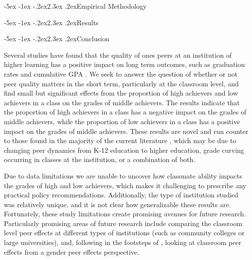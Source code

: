 \documentclass[12pt,a4paper,english,fleqn]{article}
\makeatletter
\renewcommand\section{\@startsection{section}{1}{\z@}
{-5ex \@plus -1ex \@minus -.2ex}{2.3ex \@plus.2ex}{\normalfont\large\bf}}
\makeatother
\begin{document}


\section{Empirical Methodology}\label{methods}



\section{Results}\label{results}



\section{Conclusion}\label{conclusion}


Several studies have found that the quality of ones peers at an institution of higher learning has a positive impact on long term outcomes, such as graduation rates and cumulative GPA \citep{smith2015new,luppino2015college,ost2010role}.
We seek to answer the question of whether or not peer quality matters in the short term, particularly at the classroom level, and find small but significant effects from the proportion of high achievers and low achievers in a class on the grades of middle achievers. 
The results indicate that the proportion of high achievers in a class has a negative impact on the grades of middle achievers, while the proportion of low achievers in a class has a positive impact on the grades of middle achievers. 
These results are novel and run counter to those found in the majority of the current literature \citep{kang2007classroom,carman2012classroom,burke2013classroom,schlosser2008inside,lavy2012good}, which may be due to changing peer dynamics from K-12 education to higher education, grade curving occurring in classes at the institution, or a combination of both.
 
Due to data limitations we are unable to uncover how classmate ability impacts the grades of high and low achievers, which makes it challenging to prescribe any practical policy recommendations.
Additionally, the type of institution studied was relatively unique, and it is not clear how generalizable these results are. 
Fortunately, these study limitations create promising avenues for future research.
Particularly promising areas of future research include comparing the classroom level peer effects at different types of institutions (such as community colleges or large universities), and, following in the footsteps of \citet{oosterbeek2014gender}, looking at classroom peer effects from a gender peer effects perspective.
       
\newpage{}
\pagestyle{plain}
\singlespacing



\clearpage{}

\begin{appendices}



\end{appendices}
\end{document}
